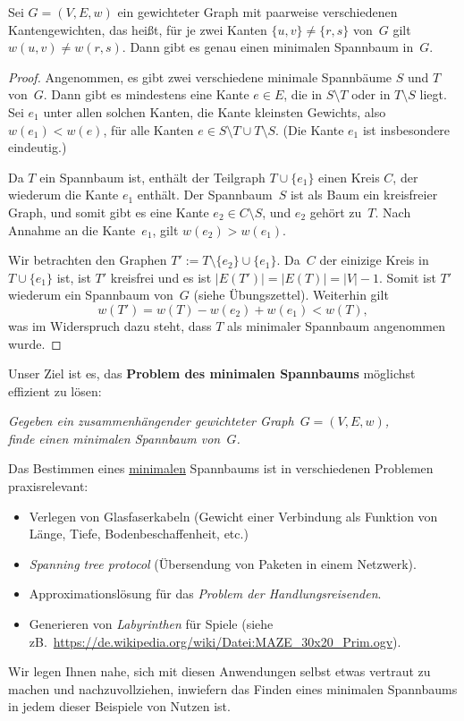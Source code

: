 \begin{prop}
Sei $G=(V,E,w)$ ein gewichteter Graph mit paarweise verschiedenen Kantengewichten, das hei\ss t, für je zwei Kanten $\{u,v\} \neq \{r,s\}$ von~$G$ gilt $w(u,v) \neq w(r,s)$.
Dann gibt es genau einen minimalen Spannbaum in~$G$.
\end{prop}
\begin{proof}
Angenommen, es gibt zwei verschiedene minimale Spannbäume $S$ und $T$ von~$G$.
Dann gibt es mindestens eine Kante $e \in E$, die in $S \setminus T$ oder in $T \setminus S$ liegt.
Sei $e_1$ unter allen solchen Kanten, die Kante kleinsten Gewichts, also $w(e_1) < w(e)$, für alle Kanten $e \in S \setminus T \cup T \setminus S$.
(Die Kante $e_1$ ist insbesondere eindeutig.)

Da $T$ ein Spannbaum ist, enthält der Teilgraph $T \cup \{e_1\}$ einen Kreis $C$, der wiederum die Kante $e_1$ enthält.
Der Spannbaum~$S$ ist als Baum ein kreisfreier Graph, und somit gibt es eine Kante $e_2 \in C \setminus S$, und $e_2$ gehört zu~$T$.
Nach Annahme an die Kante~$e_1$, gilt $w(e_2) > w(e_1)$.

\condclearpage

Wir betrachten den Graphen $T' := T \setminus \{e_2\} \cup \{e_1\}$.
Da~$C$ der einizige Kreis in $T \cup \{e_1\}$ ist, ist $T'$ kreisfrei und es ist $|E(T')| = |E(T)| = |V|-1$.
Somit ist $T'$ wiederum ein Spannbaum von~$G$ (siehe Übungszettel).
Weiterhin gilt
\[
w(T') = w(T) - w(e_2) + w(e_1) < w(T),
\]
was im Widerspruch dazu steht, dass $T$ als minimaler Spannbaum angenommen wurde.
\end{proof}

\begin{bem} 
Unser Ziel ist es, das \textbf{Problem des minimalen Spannbaums} möglichst effizient zu lösen:
\begin{center}
\textit{Gegeben ein zusammenhängender gewichteter Graph~$G=(V,E,w)$,\\ finde einen minimalen Spannbaum von~$G$.}
\end{center}
%
\noindent Das Bestimmen eines \underline{minimalen} Spannbaums ist in verschiedenen Problemen praxisrelevant:
%
\begin{itemize}
 \item Verlegen von Glasfaserkabeln (Gewicht einer Verbindung als Funktion von Länge, Tiefe, Bodenbeschaffenheit, etc.)
 \item \emph{Spanning tree protocol} (Übersendung von Paketen in einem Netzwerk).
 \item Approximationslösung für das \emph{Problem der Handlungsreisenden}.
 \item Generieren von \emph{Labyrinthen} für Spiele (siehe zB.~\url{https://de.wikipedia.org/wiki/Datei:MAZE_30x20_Prim.ogv}).
\end{itemize}
Wir legen Ihnen nahe, sich mit diesen Anwendungen selbst etwas vertraut zu machen und nachzuvollziehen, inwiefern das Finden eines minimalen Spannbaums in jedem dieser Beispiele von Nutzen ist.
\end{bem} 

